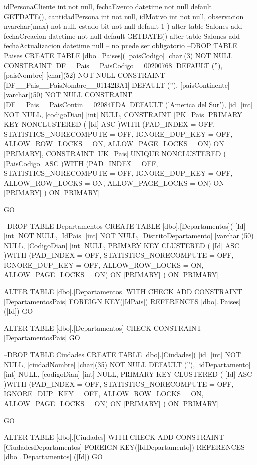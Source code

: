   idPersonaCliente int not null,
  fechaEvento datetime not null default GETDATE(),
  cantidadPersona int not null,
  idMotivo int not null,
  observacion nvarchar(max)  not null,
  estado bit not null default 1
)
alter table Salones add fechaCreacion datetime not null default GETDATE() 
alter table Salones add fechaActualizacion datetime null -- no puede ser obligatorio
--DROP TABLE Paises
CREATE TABLE [dbo].[Paises](
	[paisCodigo] [char](3) NOT NULL CONSTRAINT [DF__Pais__PaisCodigo__00200768]  DEFAULT (''),
	[paisNombre] [char](52) NOT NULL CONSTRAINT [DF__Pais__PaisNombre__01142BA1]  DEFAULT (''),
	[paisContinente] [varchar](50) NOT NULL CONSTRAINT [DF__Pais__PaisContin__02084FDA]  DEFAULT ('America del Sur'),
	[id] [int] NOT NULL,
	[codigoDian] [int] NULL,
 CONSTRAINT [PK_Pais] PRIMARY KEY NONCLUSTERED 
(
	[Id] ASC
)WITH (PAD_INDEX = OFF, STATISTICS_NORECOMPUTE = OFF, IGNORE_DUP_KEY = OFF, ALLOW_ROW_LOCKS = ON, ALLOW_PAGE_LOCKS = ON) ON [PRIMARY],
 CONSTRAINT [UK_Pais] UNIQUE NONCLUSTERED 
(
	[PaisCodigo] ASC
)WITH (PAD_INDEX = OFF, STATISTICS_NORECOMPUTE = OFF, IGNORE_DUP_KEY = OFF, ALLOW_ROW_LOCKS = ON, ALLOW_PAGE_LOCKS = ON) ON [PRIMARY]
) ON [PRIMARY]

GO

--DROP TABLE Departamentos
CREATE TABLE [dbo].[Departamentos](
	[Id] [int] NOT NULL,
	[IdPais] [int] NOT NULL,
	[DistritoDepartamento] [varchar](50) NULL,
	[CodigoDian] [int] NULL,
PRIMARY KEY CLUSTERED 
(
	[Id] ASC
)WITH (PAD_INDEX = OFF, STATISTICS_NORECOMPUTE = OFF, IGNORE_DUP_KEY = OFF, ALLOW_ROW_LOCKS = ON, ALLOW_PAGE_LOCKS = ON) ON [PRIMARY]
) ON [PRIMARY]


ALTER TABLE [dbo].[Departamentos]  WITH CHECK ADD  CONSTRAINT [DepartamentosPais] FOREIGN KEY([IdPais])
REFERENCES [dbo].[Paises] ([Id])
GO

ALTER TABLE [dbo].[Departamentos] CHECK CONSTRAINT [DepartamentosPais]
GO

--DROP TABLE Ciudades
CREATE TABLE [dbo].[Ciudades](
	[id] [int] NOT NULL,
	[ciudadNombre] [char](35) NOT NULL DEFAULT (''),
	[idDepartamento] [int] NULL,
	[codigoDian] [int] NULL,
PRIMARY KEY CLUSTERED 
(
	[Id] ASC
)WITH (PAD_INDEX = OFF, STATISTICS_NORECOMPUTE = OFF, IGNORE_DUP_KEY = OFF, ALLOW_ROW_LOCKS = ON, ALLOW_PAGE_LOCKS = ON) ON [PRIMARY]
) ON [PRIMARY]

GO

ALTER TABLE [dbo].[Ciudades]  WITH CHECK ADD  CONSTRAINT [CiudadesDepartamentos] FOREIGN KEY([IdDepartamento])
REFERENCES [dbo].[Departamentos] ([Id])
GO

